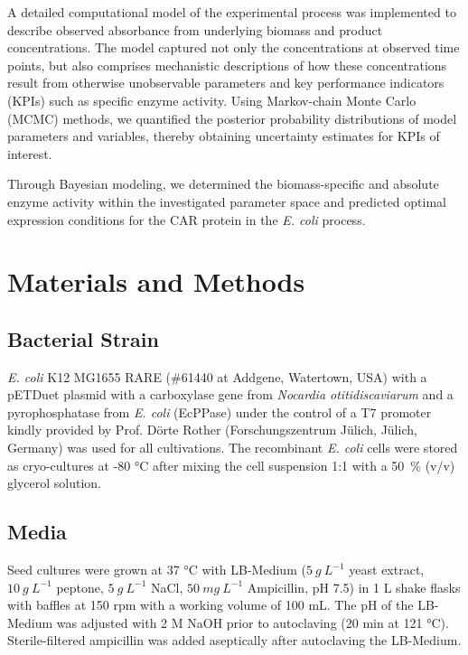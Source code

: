 \documentclass[sn-standardnature]{sn-jnl}%
\theoremstyle{thmstyleone}%
\theoremstyle{thmstyletwo}%
\theoremstyle{thmstylethree}%
\begin{document}
A detailed computational model of the experimental process was implemented to describe observed absorbance from underlying biomass and product concentrations.
The model captured not only the concentrations at observed time points, but also comprises mechanistic descriptions of how these concentrations result from otherwise unobservable parameters and key performance indicators (KPIs) such as specific enzyme activity.
Using Markov-chain Monte Carlo (MCMC) methods, we quantified the posterior probability distributions of model parameters and variables, thereby obtaining uncertainty estimates for KPIs of interest.

Through Bayesian modeling, we determined the biomass-specific and absolute enzyme activity within the investigated parameter space and predicted optimal expression conditions for the CAR protein in the \textit{E. coli} process.

\section*{Materials and Methods}
\label{sec_mmm}

\subsection{Bacterial Strain}

\textit{E. coli} K12 MG1655 RARE (\#61440 at Addgene, Watertown, USA) with a pETDuet plasmid with a carboxylase gene from \textit{Nocardia otitidiscaviarum} and a pyrophosphatase from \textit{E. coli} (EcPPase) under the control of a T7 promoter \cite{weber2021production} kindly provided by Prof. Dörte Rother (Forschungszentrum Jülich, Jülich, Germany) was used for all cultivations.
The recombinant \textit{E. coli} cells were stored as cryo-cultures at -80 °C after mixing the cell suspension 1:1 with a 50~\% (v/v) glycerol solution.

\subsection{Media}

Seed cultures were grown at 37 °C with LB-Medium ($5\ g\ L^{-1}$ yeast extract, $10\ g\ L^{-1}$ peptone, $5\ g\ L^{-1}$ NaCl, $50\ mg\ L^{-1}$ Ampicillin, pH 7.5) in 1 L shake flasks with baffles at 150 rpm with a working volume of 100 mL.
The pH of the LB-Medium was adjusted with 2 M NaOH prior to autoclaving (20 min at 121 °C).
Sterile-filtered ampicillin  was added aseptically after autoclaving the LB-Medium.
\end{document}
